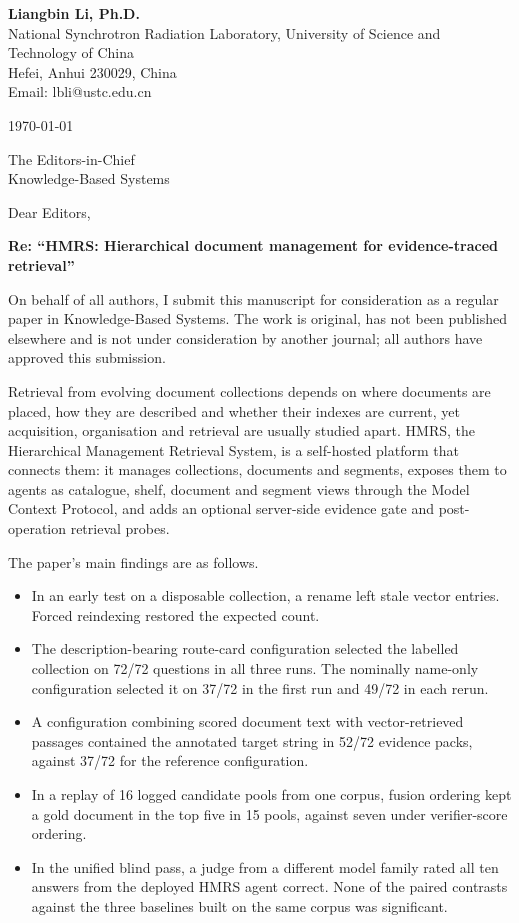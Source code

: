\documentclass[11pt,a4paper]{article}
\begin{document}
\textbf{Liangbin Li, Ph.D.}\\
{}National Synchrotron Radiation Laboratory, University of Science and Technology of China\\
{}Hefei, Anhui 230029, China\\
Email: lbli@ustc.edu.cn

\today

The Editors-in-Chief\\
Knowledge-Based Systems

Dear Editors,

\textbf{Re: ``HMRS: Hierarchical document management for evidence-traced retrieval''}

On behalf of all authors, I submit this manuscript for consideration as a
regular paper in Knowledge-Based Systems. The work is original, has not
been published elsewhere and is not under consideration by another
journal; all authors have approved this submission.

Retrieval from evolving document collections depends on where documents
are placed, how they are described and whether their indexes are current,
yet acquisition, organisation and retrieval are usually studied apart.
HMRS, the Hierarchical Management Retrieval System, is a self-hosted
platform that connects them: it manages collections, documents and
segments, exposes them to agents as catalogue, shelf, document and
segment views through the Model Context Protocol, and adds an optional
server-side evidence gate and post-operation retrieval probes.

The paper's main findings are as follows.
\begin{itemize}[leftmargin=1.5em,itemsep=1pt,topsep=2pt,parsep=0pt]
\item In an early test on a disposable collection, a rename left stale
vector entries. Forced reindexing restored the expected count.
\item The description-bearing route-card configuration selected the labelled
collection on 72/72 questions in all three runs. The nominally name-only
configuration selected it on 37/72 in the first run and 49/72 in each rerun.
\item A configuration combining scored document text with
vector-retrieved passages contained the annotated target string in 52/72
evidence packs, against 37/72 for the reference configuration.
\item In a replay of 16 logged candidate pools from one corpus, fusion
ordering kept a gold document in the top five in 15 pools, against seven
under verifier-score ordering.
\item In the unified blind pass, a judge from a different model family
rated all ten answers from the deployed HMRS agent correct. None of the
paired contrasts against the three baselines built on the same corpus was
significant.
\end{itemize}
\end{document}
